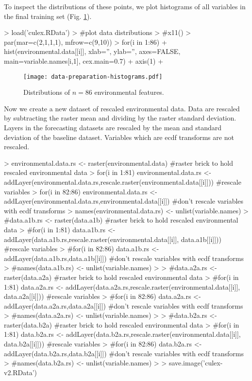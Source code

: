\documentclass[10pt]{article}
\renewenvironment{Schunk}{\vspace{\topsep}}{\vspace{\topsep}}
\begin{document}
To inspect the distributions of these points, we plot histograms of all variables in the final training set (Fig. \ref{fig:histograms}).

\begin{Schunk}
\begin{Sinput}
> load('culex.RData')
> #plot data distributions
> #x11()
> par(mar=c(2,1,1,1), mfrow=c(9,10))
> for(i in 1:86){
+   hist(environmental.data[[i]], xlab='', ylab='', axes=FALSE, main=variable.names[i,1], cex.main=0.7)
+   axis(1)
+ }
\end{Sinput}
\end{Schunk}

\begin{figure}
  \begin{center}
    \texttt{[image: data-preparation-histograms.pdf]}
    \caption{Distributions of $n=86$ environmental features.}  
    \label{fig:histograms}
  \end{center}
\end{figure}

Now we create a new dataset of rescaled environmental data. Data are rescaled by subtracting the raster mean and dividing by the raster standard deviation. Layers in the forecasting datasets are rescaled by the mean and standard deviation of the baseline dataset. Variables which are ecdf transforms are not rescaled.

\begin{Schunk}
\begin{Sinput}
> environmental.data.rs <- raster(environmental.data)   #raster brick to hold rescaled environmental data
> for(i in 1:81) environmental.data.rs <- addLayer(environmental.data.rs,rescale.raster(environmental.data[[i]]))  #rescale variables
> for(i in 82:86) environmental.data.rs <- addLayer(environmental.data.rs,environmental.data[[i]]) #don't rescale variables with ecdf transforms
> names(environmental.data.rs) <- unlist(variable.names)
> #data.a1b.rs <- raster(data.a1b)   #raster brick to hold rescaled environmental data
> #for(i in 1:81) data.a1b.rs <- addLayer(data.a1b.rs,rescale.raster(environmental.data[[i]], data.a1b[[i]]))  #rescale variables
> #for(i in 82:86) data.a1b.rs <- addLayer(data.a1b.rs,data.a1b[[i]]) #don't rescale variables with ecdf transforms
> #names(data.a1b.rs) <- unlist(variable.names)
> 
> #data.a2a.rs <- raster(data.a2a)   #raster brick to hold rescaled environmental data
> #for(i in 1:81) data.a2a.rs <- addLayer(data.a2a.rs,rescale.raster(environmental.data[[i]], data.a2a[[i]]))  #rescale variables
> #for(i in 82:86) data.a2a.rs <- addLayer(data.a2a.rs,data.a2a[[i]]) #don't rescale variables with ecdf transforms
> #names(data.a2a.rs) <- unlist(variable.names)
> 
> #data.b2a.rs <- raster(data.b2a)   #raster brick to hold rescaled environmental data
> #for(i in 1:81) data.b2a.rs <- addLayer(data.b2a.rs,rescale.raster(environmental.data[[i]], data.b2a[[i]]))  #rescale variables
> #for(i in 82:86) data.b2a.rs <- addLayer(data.b2a.rs,data.b2a[[i]]) #don't rescale variables with ecdf transforms
> #names(data.b2a.rs) <- unlist(variable.names)
> 
> save.image('culex-v2.RData')
\end{Sinput}
\end{Schunk}
\end{document}
